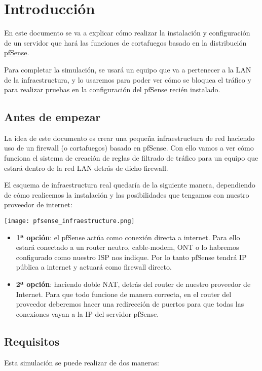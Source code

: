 \chapter{Introducción}

En este documento se va a explicar cómo realizar la instalación y configuración de un servidor que hará las funciones de cortafuegos basado en la distribución \href{https://www.pfsense.org/}{pfSense}.

Para completar la simulación, se usará un equipo que va a pertenecer a la LAN de la infraestructura, y lo usaremos para poder ver cómo se bloquea el tráfico y para realizar pruebas en la configuración del pfSense recién instalado.


\section{Antes de empezar}
La idea de este documento es crear una pequeña infraestructura de red haciendo uso de un firewall (o cortafuegos) basado en pfSense. Con ello vamos a ver cómo funciona el sistema de creación de reglas de filtrado de tráfico para un equipo que estará dentro de la red LAN detrás de dicho firewall.

El esquema de infraestructura real  quedaría de la siguiente manera, dependiendo de cómo realicemos la instalación y las posibilidades que tengamos con nuestro proveedor de internet:

\begin{center}
    \texttt{[image: pfsense\_infraestructure.png]}
\end{center}


\begin{itemize}
    \item \textbf{1ª opción}: el pfSense actúa como conexión directa a internet. Para ello estará conectado a un router neutro, cable-modem, ONT  o lo habremos configurado como nuestro ISP nos indique. Por lo tanto pfSense tendrá IP pública a internet y actuará como firewall directo.
    \item \textbf{2ª opción}: haciendo doble NAT, detrás del router de nuestro proveedor de Internet. Para que todo funcione de manera correcta, en el router del proveedor deberemos hacer una redirección de puertos para que todas las conexiones vayan a la IP del servidor pfSense.
\end{itemize}

\section{Requisitos}
Esta simulación se puede realizar de dos maneras:

